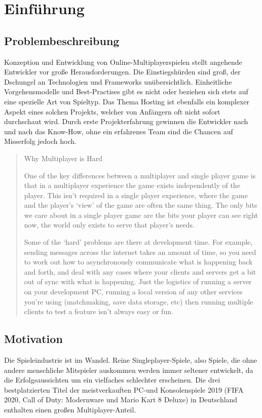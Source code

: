 \chapter{Einführung}

\section{Problembeschreibung}

Konzeption und Entwicklung von Online-Multiplayerspielen stellt angehende Entwickler vor große Herausforderungen. Die Einstiegshürden sind groß, der Dschungel an Technologien und Frameworks unübersichtlich. Einheitliche Vorgehensmodelle und Best-Practises gibt es nicht oder beziehen sich stets auf eine spezielle Art von Spieltyp. Das Thema Hosting ist ebenfalls ein komplexer Aspekt eines solchen Projekts, welcher von Anfängern oft nicht sofort durchschaut wird. Durch erste Projekterfahrung gewinnen die Entwickler nach und nach das Know-How, ohne ein erfahrenes Team sind die Chancen auf Misserfolg jedoch hoch. 

\begin{quote}
	Why Multiplayer is Hard
	
	One of the key differences between a multiplayer and single player game is that in a multiplayer experience the game exists independently of the player. This isn’t required in a single player experience, where the game and the player’s ‘view’ of the game are often the same thing. The only bits we care about in a single player game are the bits your player can see right now, the world only exists to serve that player’s needs.
	
	Some of the ‘hard’ problems are there at development time. For example, sending messages across the internet takes an amount of time, so you need to work out how to asynchronously communicate what is happening back and forth, and deal with any cases where your clients and servers get a bit out of sync with what is happening. Just the logistics of running a server on your development PC, running a local version of any other services you’re using (matchmaking, save data storage, etc) then running multiple clients to test a feature isn’t always easy or fun.
	 \cite{Payne.18.09.2019}
\end{quote}


\section{Motivation}
Die Spieleindustrie ist im Wandel. Reine Singleplayer-Spiele, also Spiele, die ohne andere menschliche Mitspieler auskommen werden immer seltener entwickelt, da die Erfolgsaussichten um ein vielfaches schlechter erscheinen. Die drei bestplatzierten Titel der meistverkauften PC-und Konsolenspiele 2019 (FIFA 2020, Call of Duty: Modernware und Mario Kart 8 Deluxe) in Deutschland enthalten einen großen Multiplayer-Anteil.\cite{gameVerbandderdeutschenGamesBranchee.V..2020}

